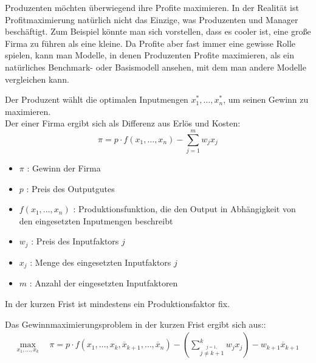 Produzenten möchten überwiegend ihre Profite maximieren.
In der Realität ist Profitmaximierung natürlich nicht das Einzige, was
Produzenten und Manager beschäftigt. Zum Beispiel könnte man sich
vorstellen, dass es cooler ist, eine große Firma zu führen als eine kleine. Da
Profite aber fast immer eine gewisse Rolle spielen, kann man Modelle, in
denen Produzenten Profite maximieren, als ein natürliches Benchmark-
oder Basismodell ansehen, mit dem man andere Modelle vergleichen kann.


\begin{construction} \label{lange-frist}
	Der Produzent wählt die optimalen Inputmengen \( x_1^*, \dots, x_n^* \), um seinen Gewinn zu maximieren. \\
	Der  einer Firma ergibt sich als Differenz aus Erlös und Kosten:
	\[
		\pi = p \cdot f(x_1, \dots, x_n) - \sum_{j=1}^{m} w_j x_j
	\]
	\begin{itemize}
		\item \( \pi \) : Gewinn der Firma
		\item \( p \) : Preis des Outputgutes
		\item \( f(x_1, \dots, x_n) \) : Produktionsfunktion, die den Output in Abhängigkeit von den eingesetzten Inputmengen beschreibt
		\item \( w_j \) : Preis des Inputfaktors \( j \)
		\item \( x_j \) : Menge des eingesetzten Inputfaktors \( j \)
		\item \( m \) : Anzahl der eingesetzten Inputfaktoren
	\end{itemize}

\end{construction}

In der kurzen Frist ist mindestens ein Produktionsfaktor fix.
\begin{construction}
	Das Gewinnmaximierungsproblem in der kurzen Frist ergibt sich aus::
	\begin{align*}
		\max_{x_1, \dots, x_k} \ \  & \pi = p \cdot f(x_1, \dots, x_k, \overline{x}_{k+1}, \dots, \overline{x}_n) -\left( \sum_{\overset{j=1,}{ j \neq k+1}}^{k} w_j x_j\right) - w_{k+1}\overline{x}_{k+1}
	\end{align*}


\end{construction}

